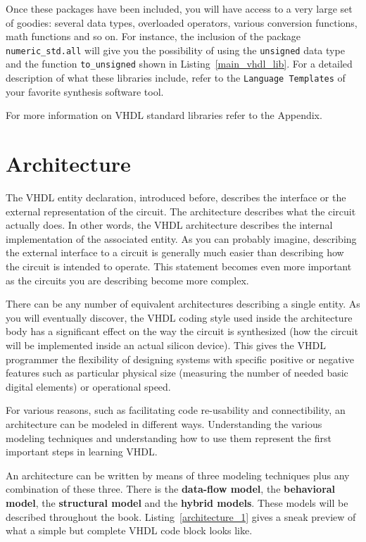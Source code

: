 Once these packages have been included, you will have access to a very large set of goodies: several data types, overloaded operators, various conversion functions, math functions and so on. For instance, the inclusion of the package \texttt{numeric\_std.all} will give you the possibility of using the \texttt{unsigned} data type and the function \texttt{to\_unsigned} shown in Listing~\ref{main_vhdl_lib}. For a detailed description of what these libraries include, refer to the \texttt{Language Templates} of your favorite synthesis software tool.

For more information on VHDL standard libraries refer to the Appendix.

\section{Architecture}
The VHDL entity declaration, introduced before, describes the interface or the external representation of the circuit. The architecture describes what the circuit actually does. In other words, the VHDL architecture describes the internal implementation of the associated entity. As you can probably imagine, describing the external interface to a circuit is generally much easier than describing how the circuit is intended to operate. This statement becomes even more important as the circuits you are describing become more complex.

There can be any number of equivalent architectures describing a single entity. As you will eventually discover, the VHDL coding style used inside the architecture body has a significant effect on the way the circuit is synthesized (how the circuit will be implemented inside an actual silicon device). This gives the VHDL programmer the flexibility of designing systems with specific positive or negative features such as particular physical size (measuring the number of needed basic digital elements) or operational speed.

For various reasons, such as facilitating code re-usability and connectibility, an architecture can be modeled in different ways. Understanding the various modeling techniques and understanding how to use them represent the first important steps in learning VHDL.

An architecture can be written by means of three modeling techniques plus any combination of these three. There is the \textbf{data-flow model}, the \textbf{behavioral model}, the \textbf{structural model} and the \textbf{hybrid models}. These models will be described throughout the book. Listing~\ref{architecture_1} gives a sneak preview of what a simple but complete VHDL code block looks like.

